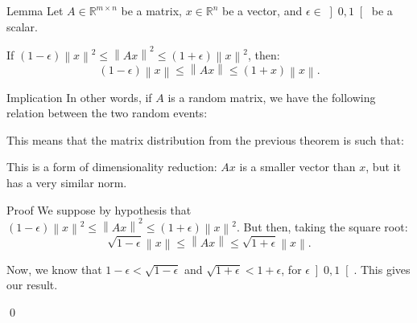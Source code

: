 \documentclass[a4paper]{article}
\begin{document}
\begin{parag}{Lemma}
    Let $A \in \mathbb{R}^{m \times n}$ be a matrix, $x \in \mathbb{R}^n$ be a vector, and $\epsilon \in \left]0, 1\right[ $ be a scalar.

    If $\left(1 - \epsilon\right) \left\|x\right\|^2 \leq \left\|A x\right\|^2 \leq \left(1 + \epsilon\right) \left\|x\right\|^2$, then: 
    \[\left(1 - \epsilon\right) \left\|x\right\| \leq \left\|A x\right\| \leq \left(1 + x\right) \left\|x\right\|.\]

    \begin{subparag}{Implication}
        In other words, if $A$ is a random matrix, we have the following relation between the two random events:

        This means that the matrix distribution from the previous theorem is such that:

        This is a form of dimensionality reduction: $A x$ is a smaller vector than $x$, but it has a very similar norm.
    \end{subparag}
    
    \begin{subparag}{Proof}
        We suppose by hypothesis that $\left(1 - \epsilon\right) \left\|x\right\|^2 \leq \left\|A x\right\|^2 \leq \left(1 + \epsilon\right) \left\|x\right\|^2$. But then, taking the square root: 
        \[\sqrt{1 - \epsilon} \left\|x\right\| \leq \left\|A x\right\| \leq \sqrt{1 + \epsilon} \left\|x\right\|.\]
        
        Now, we know that $1 - \epsilon < \sqrt{1 - \epsilon}$ and $\sqrt{1 + \epsilon} < 1 + \epsilon$, for $\epsilon \left]0, 1\right[ $. This gives our result.

        \qed
    \end{subparag}
\end{parag}
\end{document}
